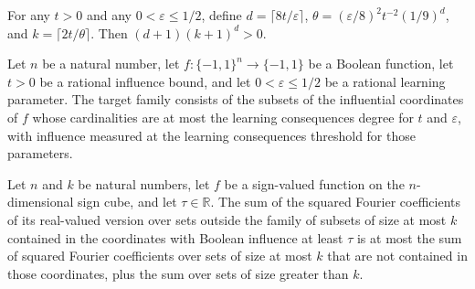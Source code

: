 \begin{theorem}
\label{FABL.learningConsequencesFamilyBound_pos}
\leanok
{}
For any $t>0$ and any $0<\varepsilon\leq1/2$, define $d=\lceil8t/\varepsilon\rceil$,
$\theta=(\varepsilon/8)^2t^{-2}(1/9)^d$, and $k=\lceil2t/\theta\rceil$. Then
$(d+1)(k+1)^d>0$.
\end{theorem}

\begin{definition}
\label{FABL.learningConsequencesTargetFamily}
\leanok
{}
Let $n$ be a natural number, let $f:\{−1,1\}^n\to\{−1,1\}$ be a Boolean function, let
$t>0$ be a rational influence bound, and let $0<\varepsilon\leq 1/2$ be a rational
learning parameter. The target family consists of the subsets of the influential
coordinates of $f$ whose cardinalities are at most the learning consequences degree for
$t$ and $\varepsilon$, with influence measured at the learning consequences threshold
for those parameters.
\end{definition}

\begin{theorem}
\label{FABL.fourierWeightOutside_lowDegreeSubsets_influential_le_add}
\leanok
{}
Let $n$ and $k$ be natural numbers, let $f$ be a sign-valued function on the
$n$-dimensional sign cube, and let $\tau\in\mathbb{R}$. The sum of the squared Fourier
coefficients of its real-valued version over sets outside the family of subsets of size
at most $k$ contained in the coordinates with Boolean influence at least $\tau$ is at
most the sum of squared Fourier coefficients over sets of size at most $k$ that are not
contained in those coordinates, plus the sum over sets of size greater than $k$.
\end{theorem}

